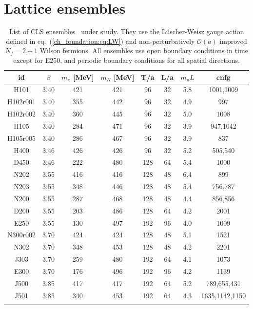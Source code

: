 
\chapter{Lattice ensembles}
\label{apex_ensembles}

\begin{longtable}{c c c c c c c c}
\label{apex_ensembles:tab:ens}
    id & $\beta$ & $m_{\pi}$ [MeV] & $m_K$ [MeV] & T/a & L/a & $m_{\pi}L$ & cnfg \\
    \toprule
    H101 & 3.40 & 421 & 421 & 96 & 32 & 5.8 & 1001,1009 \\
    H102r001 & 3.40 & 355 & 442 & 96 & 32 & 4.9 & 997 \\
    H102r002 & 3.40 & 360 & 445 & 96 & 32 & 5.0 & 1008 \\
    H105 & 3.40 & 284 & 471 & 96 & 32 & 3.9 & 947,1042 \\
    H105r005 & 3.40 & 286 & 467 & 96 & 32 & 3.9 & 837 \\
\midrule
    H400 & 3.46 & 426 & 426 & 96 & 32 & 5.2 & 505,540 \\
    D450 & 3.46 & 222 & 480 & 128 & 64 & 5.4 & 1000 \\
\midrule
    N202 & 3.55 & 416 & 416 & 128 & 48 & 6.4 & 899 \\
    N203 & 3.55 & 348 & 446 & 128 & 48 & 5.4 & 756,787 \\
    N200 & 3.55 & 287 & 468 & 128 & 48 & 4.4 & 856,856 \\
    D200 & 3.55 & 203 & 486 & 128 & 64 & 4.2 & 2001 \\
    E250 & 3.55 & 130 & 497 & 192 & 96 & 4.0 & 1009\\
\midrule
    N300r002 & 3.70 & 424 & 424 & 128 & 48 & 5.1 & 1521 \\
    N302 & 3.70 & 348 & 453 & 128 & 48 & 4.2 & 2201 \\
    J303 & 3.70 & 259 & 480 & 192 & 64 & 4.1 & 1073 \\
    E300 & 3.70 & 176 & 496 & 192 & 96 & 4.2 & 1139 \\ 
\midrule
    J500 & 3.85 & 417 & 417 & 192 & 64 & 5.2 & 789,655,431 \\
    J501 & 3.85 & 340 & 453 & 192 & 64 & 4.3 & 1635,1142,1150 \\
    \bottomrule
    \caption{List of CLS ensembles~\cite{} under study. They use the Lüscher-Weisz gauge action defined in eq.~(\ref{ch_foundation:eq:LW}) and non-perturbatively $\mathcal{O}(a)$ improved $N_f=2+1$ Wilson fermions. All ensembles use open boundary conditions in time except for E250, and periodic boundary conditions for all spatial directions.}
\end{longtable}


